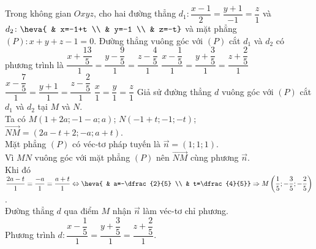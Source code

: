 \begin{ex}%
Trong không gian $Oxyz$, cho hai đường thẳng $d_1\colon \dfrac{x-1}{2}=\dfrac{y+1}{-1}=\dfrac{z}{1}$ và $d_2\colon \heva{ & x=-1+t \\ & y=-1 \\ & z=-t}$ và mặt phẳng $(P)\colon x+y+z-1=0$. Đường thẳng vuông góc với $(P)$ cắt $d_1$ và $d_2$ có phương trình là
\choice
{$\dfrac{x+\dfrac{13}{5}}{1}=\dfrac{y-\dfrac{9}{5}}{1}=\dfrac{z-\dfrac{4}{5}}{1}$}
{\True $\dfrac{x-\dfrac{1}{5}}{1}=\dfrac{y+\dfrac{3}{5}}{1}=\dfrac{z+\dfrac{2}{5}}{1}$}
{$\dfrac{x-\dfrac{7}{5}}{1}=\dfrac{y+1}{1}=\dfrac{z-\dfrac{2}{5}}{1}$}
{$\dfrac{x}{1}=\dfrac{y}{1}=\dfrac{z}{1}$}
\loigiai
{
Giả sử đường thẳng $d$ vuông góc với $(P)$ cắt $d_1$ và $d_2$ tại $M$ và $N$.\\
Ta có $M(1+2a;-1-a;a)$; $N(-1+t;-1;-t)$; $\overrightarrow{NM}=(2a-t+2;-a;a+t)$.\\
Mặt phẳng $(P)$ có véc-tơ pháp tuyến là $\overrightarrow{n}=(1;1;1)$.\\
Vì $MN$ vuông góc với mặt phẳng $(P)$ nên $\overrightarrow{NM}$ cùng phương $\overrightarrow{n}$.\\
Khi đó $\dfrac{2a-t}{1}=\dfrac{-a}{1}=\dfrac{a+t}{1} \Leftrightarrow \heva{ & a=-\dfrac{2}{5} \\ & t=\dfrac{4}{5}} \Rightarrow M\left(\dfrac{1}{5};-\dfrac{3}{5};-\dfrac{2}{5}\right)$.\\
Đường thẳng $d$ qua điểm $M$ nhận $\overrightarrow{n}$ làm véc-tơ chỉ phương.\\
Phương trình $d\colon \dfrac{x-\dfrac{1}{5}}{1}=\dfrac{y+\dfrac{3}{5}}{1}=\dfrac{z+\dfrac{2}{5}}{1}$.
}
\end{ex}

